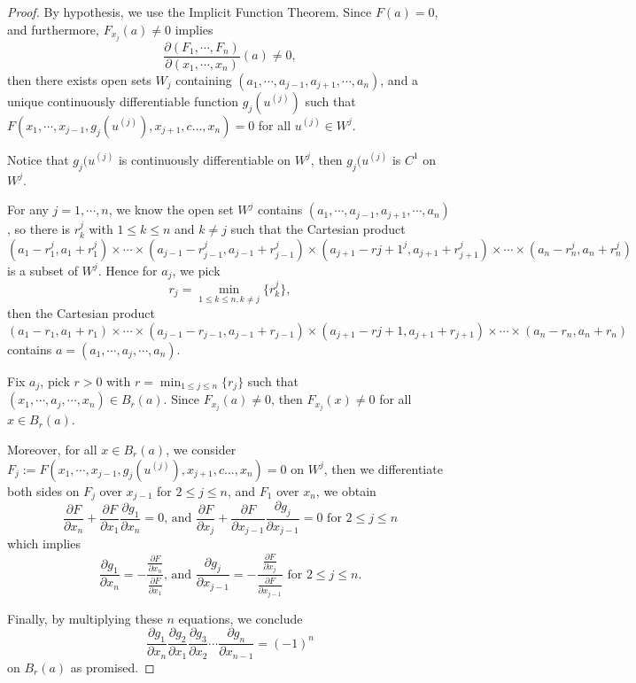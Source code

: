 \begin{Exercise}
\begin{proof}
By hypothesis, we use the Implicit Function Theorem. Since $F(a) = 0$, and furthermore, $F_{x_j}(a) \neq 0$ implies
$$
\frac{\partial(F_1,\cdots,F_n)}{\partial(x_1,\cdots,x_n)}(a) \neq 0,
$$
then there exists open sets $W_j$ containing $(a_1,\cdots,a_{j-1},a_{j+1},\cdots,a_n)$, and a unique continuously differentiable function $g_j(u^{(j)})$ such that $F(x_1,\cdots,x_{j-1},g_j(u^{(j)}),x_{j+1},c\dots,x_n)=0$ for all $u^{(j)}\in W^j$.

Notice that $g_j(u^{(j)}$ is continuously differentiable on $W^j$, then $g_j(u^{(j)}$ is $C^1$ on $W^j$.

For any $j=1,\cdots, n$, we know the open set $W^j$ contains $(a_1,\cdots,a_{j-1},a_{j+1},\cdots,a_n)$, so there is $r_k^j$ with $1\leq k\leq n$ and $k\neq j$ such that the Cartesian product $(a_1-r_1^j,a_1+r_1^j)\times\cdots\times(a_{j-1}-r_{j-1}^j,a_{j-1}+r_{j-1}^j)\times(a_{j+1}-r{j+1}^j,a_{j+1}+r_{j+1}^j)\times\cdots\times(a_n-r_n^j,a_n+r_n^j)
$ is a subset of $W^j$. Hence for $a_j$, we pick
$$
r_j = \min_{1\leq k\leq n, k\neq j}\{r_k^j\},
$$
then the Cartesian product $(a_1-r_1,a_1+r_1)\times\cdots\times(a_{j-1}-r_{j-1},a_{j-1}+r_{j-1})\times(a_{j+1}-r{j+1},a_{j+1}+r_{j+1})\times\cdots\times(a_n-r_n,a_n+r_n)$ contains $a=(a_1,\cdots,a_j,\cdots,a_n)$.

Fix $a_j$, pick $r>0$ with $r=\min_{1\leq j \leq n}\{r_j\}$ such that $(x_1,\cdots,a_j,\cdots,x_n)\in B_r(a)$. Since $F_{x_j}(a) \neq 0$, then $F_{x_j}(x) \neq 0$ for all $x\in B_r(a)$. 

Moreover, for all $x\in B_r(a)$, we consider
$F_j := F(x_1,\cdots,x_{j-1},g_j(u^{(j)}),x_{j+1},c\dots,x_n)=0$ on $W^j$, then we differentiate both sides on $F_j$ over $x_{j-1}$ for $2\leq j \leq n$, and $F_1$ over $x_n$, we obtain
$$
\frac{\partial F}{\partial x_n} + \frac{\partial F}{\partial x_1}\frac{\partial g_1}{\partial x_n} = 0\text{, and }
\frac{\partial F}{\partial x_j} + \frac{\partial F}{\partial x_{j-1}}\frac{\partial g_j}{\partial x_{j-1}} = 0 \mbox{ for } 2\leq j \leq n
$$
which implies
$$
\frac{\partial g_1}{\partial x_n} = -\frac{\frac{\partial F}{\partial x_n}}{\frac{\partial F}{\partial x_1}}\text{, and }
\frac{\partial g_j}{\partial x_{j-1}} = -\frac{\frac{\partial F}{\partial x_j}}{\frac{\partial F}{\partial x_{j-1}}} \mbox{ for } 2\leq j \leq n.
$$

Finally, by multiplying these $n$ equations, we conclude
$$
\frac{\partial g_1}{\partial x_n}\frac{\partial g_2}{\partial x_1}\frac{\partial g_3}{\partial x_2}\cdots\frac{\partial g_n}{\partial x_{n-1}} = (-1)^n
$$
on $B_r(a)$ as promised.
\end{proof}
\end{Exercise}
